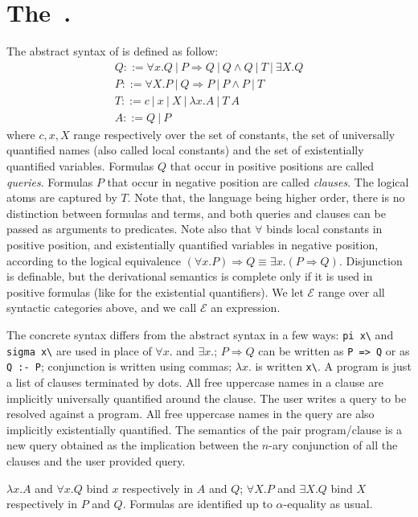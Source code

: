 \documentclass{llncs}
\begin{document}
\section{The~\frag.}\label{sec:fragment}
The abstract syntax of \lp{} is defined as follow:
$$\begin{array}{l}
   Q ::= \forall x.Q ~|~ P \Rightarrow Q ~|~ Q \wedge Q ~|~ T ~|~ \exists X.Q \\
   P ::= \forall X.P ~|~ Q \Rightarrow P ~|~ P \wedge P ~|~ T\\
   T ::= c ~|~ x ~|~ X ~|~ \lambda x.A ~|~ T~A\\
   A ::= Q ~|~ P
\end{array}$$
where $c,x,X$ range respectively over the set of constants, the set of universally quantified names (also called local constants) and the set of existentially quantified variables. Formulas $Q$ that occur in positive positions are called \emph{queries}. Formulas $P$ that occur in negative position are called \emph{clauses}. The logical atoms are captured by $T$. Note that, the language being
higher order, there is no distinction between formulas and terms, and both queries and clauses can be passed as arguments to predicates. Note also that $\forall$ binds local constants in positive position, and existentially quantified variables in negative position, according to the logical equivalence
$(\forall x.P) \Rightarrow Q \equiv \exists x.(P \Rightarrow Q)$. Disjunction
is definable, but the derivational semantics is complete only if it is used in
positive formulas (like for the existential quantifiers). We let $\mathcal{E}$ range over all syntactic categories above, and we call $\mathcal{E}$ an expression.

The concrete syntax differs from the abstract syntax in a few ways: \verb+pi x\+ and \verb+sigma x\+ are used in place of $\forall x.$ and $\exists x.$; $P \Rightarrow Q$ can be written as \verb+P => Q+ or as \verb+Q :- P+; conjunction is written using commas; $\lambda x.$ is written \verb+x\+. A program is just a list of clauses terminated by dots. All free uppercase names in a clause are implicitly universally quantified around the clause. The user writes a query to be resolved against a program. All free uppercase names in the query are also implicitly existentially quantified. The semantics of the pair program/clause is a new query obtained as the implication between the $n$-ary conjunction of all the clauses and the user provided query.

$\lambda x.A$ and $\forall x.Q$ bind $x$ respectively in $A$ and $Q$;
$\forall X.P$ and $\exists X.Q$ bind $X$ respectively in $P$ and $Q$.
Formulas are identified up to $\alpha$-equality as usual.
\end{document}
